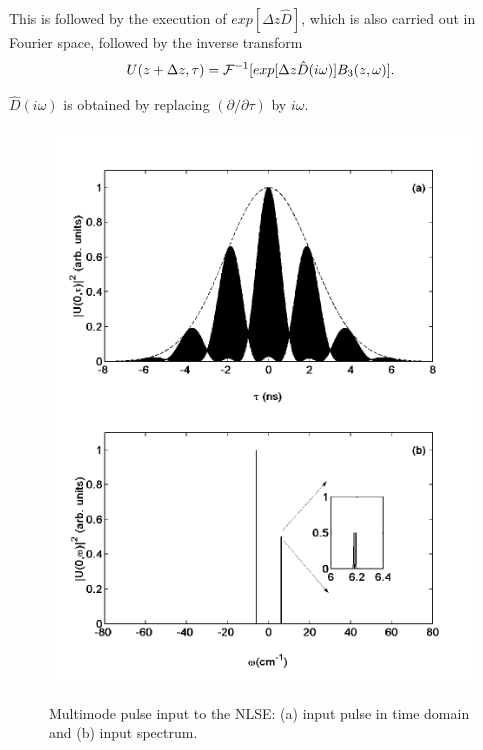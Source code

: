 This is followed by the execution of $exp[\Delta z \hat{D}]$, which is also
carried out in Fourier space, followed by the inverse transform
\begin{equation}
U(z + \Delta z,\tau) = {\cal{F}}^{-1}[exp[\Delta z \hat{D}(i\omega)]B_{3}(z,\omega)] .
\end{equation}

$\hat{D}(i\omega)$ is obtained by replacing $(\partial / \partial \tau)$
by $i \omega$.

\begin{figure}
\begin{center}
\includegraphics[width=5in]{nlsetime.pdf}
\end{center}
\renewcommand{\baselinestretch}{1}
\small\normalsize
\begin{quote}
\caption[Multimode pulse input toe NLSE]
{Multimode pulse input to the NLSE: (a) input pulse in time
domain and (b) input spectrum.}
\label{figA.1}
\end{quote}
\end{figure}
\renewcommand{\baselinestretch}{2}
\small\normalsize

